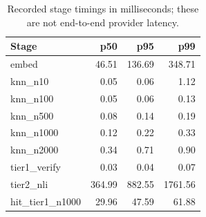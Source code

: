 \begin{table}[H]
\centering
\footnotesize
\caption{Recorded stage timings in milliseconds; these are not end-to-end provider latency.}
\label{tab:latency}
\begin{tabular}{|l|r|r|r|}
\hline
Stage & p50 & p95 & p99 \\ \hline
embed & 46.51 & 136.69 & 348.71 \\ \hline
knn\_n10 & 0.05 & 0.06 & 1.12 \\ \hline
knn\_n100 & 0.05 & 0.06 & 0.13 \\ \hline
knn\_n500 & 0.08 & 0.14 & 0.19 \\ \hline
knn\_n1000 & 0.12 & 0.22 & 0.33 \\ \hline
knn\_n2000 & 0.34 & 0.71 & 0.90 \\ \hline
tier1\_verify & 0.03 & 0.04 & 0.07 \\ \hline
tier2\_nli & 364.99 & 882.55 & 1761.56 \\ \hline
hit\_tier1\_n1000 & 29.96 & 47.59 & 61.88 \\ \hline
\end{tabular}
\end{table}
